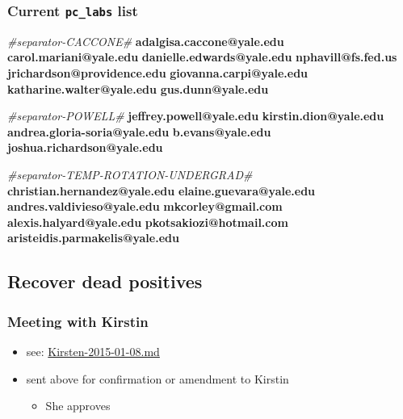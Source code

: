 \documentclass[letterpaper]{scrartcl}
\newenvironment{Shaded}{}{}
\newcommand{\KeywordTok}[1]{\textcolor[rgb]{0.00,0.44,0.13}{\textbf{{#1}}}}
\newcommand{\CommentTok}[1]{\textcolor[rgb]{0.38,0.63,0.69}{\textit{{#1}}}}
\begin{document}
\subsubsection{Current \texttt{pc\_labs}
list}\label{current-pcux5flabs-list}

\begin{Shaded}
\begin{Highlighting}[]
\CommentTok{#separator-CACCONE#}
\KeywordTok{adalgisa.caccone@yale.edu}
\KeywordTok{carol.mariani@yale.edu}
\KeywordTok{danielle.edwards@yale.edu}
\KeywordTok{nphavill@fs.fed.us}
\KeywordTok{jrichardson@providence.edu}
\KeywordTok{giovanna.carpi@yale.edu}
\KeywordTok{katharine.walter@yale.edu}
\KeywordTok{gus.dunn@yale.edu}

\CommentTok{#separator-POWELL#}
\KeywordTok{jeffrey.powell@yale.edu}
\KeywordTok{kirstin.dion@yale.edu}
\KeywordTok{andrea.gloria-soria@yale.edu}
\KeywordTok{b.evans@yale.edu}
\KeywordTok{joshua.richardson@yale.edu}

\CommentTok{#separator-TEMP-ROTATION-UNDERGRAD#}
\KeywordTok{christian.hernandez@yale.edu}
\KeywordTok{elaine.guevara@yale.edu}
\KeywordTok{andres.valdivieso@yale.edu}
\KeywordTok{mkcorley@gmail.com}
\KeywordTok{alexis.halyard@yale.edu}
\KeywordTok{pkotsakiozi@hotmail.com}
\KeywordTok{aristeidis.parmakelis@yale.edu}
\end{Highlighting}
\end{Shaded}

\subsection{Recover dead positives}\label{recover-dead-positives-3}

\subsubsection{Meeting with Kirstin}\label{meeting-with-kirstin}

\begin{itemize}
\itemsep1pt\parskip0pt
\item
  see:
  \href{file:///home/gus/Dropbox/repos/git/markdown-docs/notes/meetings/Kirsten-2015-01-08/Kirsten-2015-01-08.md}{Kirsten-2015-01-08.md}
\item
  sent above for confirmation or amendment to Kirstin

  \begin{itemize}
  \itemsep1pt\parskip0pt
  \item
    She approves
  \end{itemize}
\end{itemize}
\end{document}
